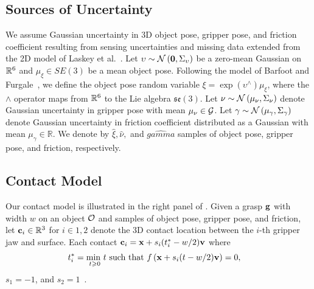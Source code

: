 \subsection{Sources of Uncertainty}
We assume Gaussian uncertainty in 3D object pose, gripper pose, and friction coefficient resulting from sensing uncertainties and missing data extended from the 2D model of Laskey et al.~\cite{laskey2015bandits}.
Let $\upsilon \sim \mathcal{N}\left(\mathbf{0}, \Sigma_{\upsilon}\right)$ be a zero-mean Gaussian on $\mathbb{R}^6$ and $\mu_{\xi} \in SE(3)$ be a mean object pose.
Following the model of Barfoot and Furgale~\cite{barfoot2014associating}, we define the object pose random variable $\xi = \exp\left( \upsilon^{\wedge} \right) \mu_{\xi}$, where the $\wedge$ operator maps from $\mathbb{R}^6$ to the Lie algebra $\mathfrak{se}(3)$.
Let $\nu \sim \mathcal{N}\left(\mu_{\nu}, \Sigma_{\nu}\right)$ denote Gaussian uncertainty in gripper pose with mean $\mu_{\nu} \in \mathcal{G}$.
Let $\gamma \sim \mathcal{N}\left(\mu_{\gamma}, \Sigma_{\gamma} \right)$ denote Gaussian uncertainty in friction coefficient distributed as a Gaussian with mean $\mu_{\gamma} \in \mathbb{R}$.
We denote by $\hat{\xi}, \hat{\nu},$ and $\hat{gamma}$ samples of object pose, gripper pose, and friction, respectively. 

\subsection{Contact Model}
Our contact model is illustrated in the right panel of .
Given a grasp $\mathbf{g}$ with width $w$ on an object $\mathcal{O}$ and samples of object pose, gripper pose, and friction, let $\mathbf{c}_i \in \mathbb{R}^3$ for $i \in {1, 2}$ denote the 3D contact location between the $i$-th gripper jaw and surface.
Each contact $\mathbf{c}_i = \mathbf{x} + s_i (t_i^* - w / 2) \mathbf{v}$ where
\begin{align*}
	t_i^* &= \underset{t \geqslant 0}{\text{min }} t \text{ such that } f\left(\mathbf{x} + s_i (t - w / 2) \mathbf{v}\right) = 0,
\end{align*}
\noindent$s_1 = -1$, and $s_2 = 1$~\cite{mahler2015gp}.


